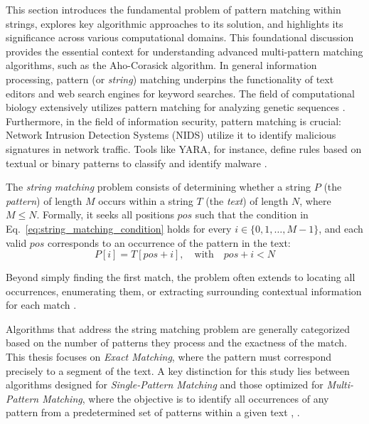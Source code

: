 This section introduces the fundamental problem of pattern matching within strings, explores key algorithmic approaches to its solution, and highlights its significance across various computational domains. This foundational discussion provides the essential context for understanding advanced multi-pattern matching algorithms, such as the Aho-Corasick algorithm. In general information processing, pattern (or \textit{string}) matching underpins the functionality of text editors and web search engines for keyword searches. The field of computational biology extensively utilizes pattern matching for analyzing genetic sequences \cite{SedgewickWayne2011}. Furthermore, in the field of information security, pattern matching is crucial: Network Intrusion Detection Systems (NIDS) utilize it to identify malicious signatures in network traffic. Tools like YARA, for instance, define rules based on textual or binary patterns to classify and identify malware \cite{YARADocs}.


The \textit{string matching} problem consists of determining whether a string $P$ (the \textit{pattern}) of length $M$ occurs within a string $T$ (the \textit{text}) of length $N$, where $M \leq N$. Formally, it seeks all positions $pos$ such that the condition in Eq.~\ref{eq:string_matching_condition} holds for every $i \in \{0, 1, \dots, M-1\}$, and each valid $pos$ corresponds to an occurrence of the pattern in the text:
\begin{equation}
    P[i] = T[pos + i], \quad \text{with} \quad pos + i < N
    \label{eq:string_matching_condition} 
\end{equation}

Beyond simply finding the first match, the problem often extends to locating all occurrences, enumerating them, or extracting surrounding contextual information for each match \cite{SedgewickWayne2011}.

Algorithms that address the string matching problem are generally categorized based on the number of patterns they process and the exactness of the match. This thesis focuses on \textit{Exact Matching}, where the pattern must correspond precisely to a segment of the text. A key distinction for this study lies between algorithms designed for \textit{Single-Pattern Matching} and those optimized for \textit{Multi-Pattern Matching}, where the objective is to identify all occurrences of any pattern from a predetermined set of patterns within a given text \cite{AhoCorasick1975}, \cite{Gusfield1997}.

